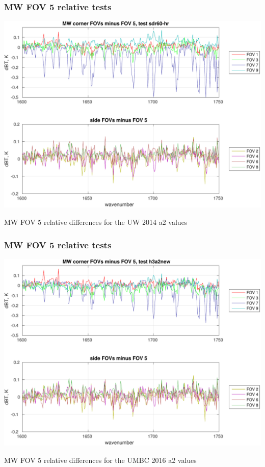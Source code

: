 \documentclass[11pt]{beamer}
\begin{document}
\begin{frame}
\frametitle{MW FOV 5 relative tests}
\begin{center}
  \includegraphics[scale=0.5]{figures/MW_FOV_5_rel_sdr60.pdf}
\end{center}
\begin{center}
  MW FOV 5 relative differences for the UW 2014 a2 values
\end{center}
\end{frame}
\begin{frame}
\frametitle{MW FOV 5 relative tests}
\begin{center}
  \includegraphics[scale=0.5]{figures/MW_FOV_5_rel_a2new.pdf}
\end{center}
\begin{center}
  MW FOV 5 relative differences for the UMBC 2016 a2 values
\end{center}
\end{frame}
\end{document}
